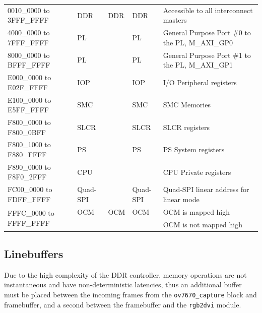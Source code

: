 \begin{table}[]
\begin{tabular}{lllll}
0010\_0000 to 3FFF\_FFFF                  & DDR          & DDR     & DDR               & Accessible to all interconnect masters                \\
4000\_0000 to 7FFF\_FFFF                  & PL           &         & PL                & General Purpose Port \#0 to the PL, M\_AXI\_GP0       \\
8000\_0000 to BFFF\_FFFF                  & PL           &         & PL                & General Purpose Port \#1 to the PL, M\_AXI\_GP1       \\
E000\_0000 to E02F\_FFFF                  & IOP          &         & IOP               & I/O Peripheral registers                              \\
E100\_0000 to E5FF\_FFFF                  & SMC          &         & SMC               & SMC Memories                                          \\
F800\_0000 to F800\_0BFF                  & SLCR         &         & SLCR              & SLCR registers                                        \\
F800\_1000 to F880\_FFFF                  & PS           &         & PS                & PS System registers                                   \\
F890\_0000 to F8F0\_2FFF                  & CPU          &         &                   & CPU Private registers                                 \\
FC00\_0000 to FDFF\_FFFF                  & Quad-SPI     &         & Quad-SPI          & Quad-SPI linear address for linear mode               \\
\multirow{2}{*}{FFFC\_0000 to FFFF\_FFFF} & OCM          & OCM     & OCM               & OCM is mapped high                                    \\
                                          &              &         &                   & OCM is not mapped high                               
\end{tabular}
\end{table}

\subsection{Linebuffers}
Due to the high complexity of the DDR controller, memory operations are not instantaneous and have non-deterministic latencies, thus an additional buffer must be placed between the incoming frames from the \texttt{ov7670\_capture} block and framebuffer, and a second between the framebuffer and the \texttt{rgb2dvi} module.

